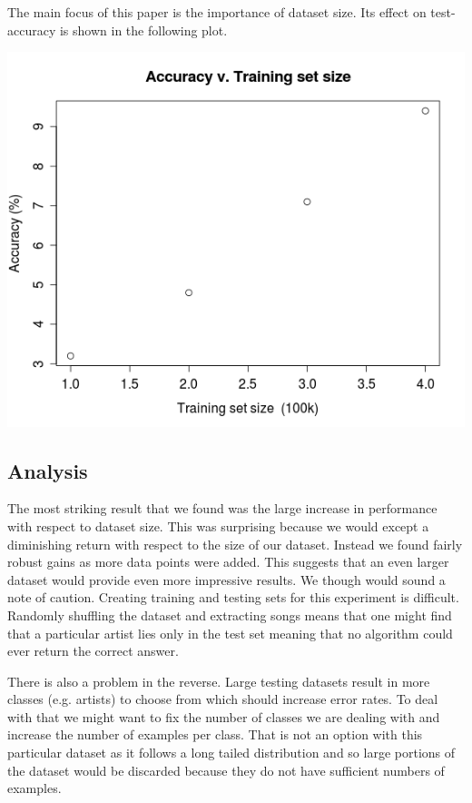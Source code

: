 \documentclass[a4paper,10pt]{article}
\begin{document}
The main focus of this paper is the importance of dataset size. Its effect on test-accuracy is shown in the following plot.
\begin{center}
 \includegraphics[scale=.4,keepaspectratio=true]{./training_set_v_accuracy.png}
\end{center}

\subsection{Analysis}
The most striking result that we found was the large increase in performance with respect to dataset size. This was surprising because we would except a diminishing return with respect to the size of our dataset. Instead we found fairly robust gains as more data points were added. This suggests that an even larger dataset would provide even more impressive results. We though would sound a note of caution. Creating training and testing sets for this experiment is difficult. Randomly shuffling the dataset and extracting songs means that one might find that a particular artist lies only in the test set meaning that no algorithm could ever return the correct answer. 

There is also a problem in the reverse. Large testing datasets result in more classes (e.g. artists) to choose from which should increase error rates. To deal with that we might want to fix the number of classes we are dealing with and increase the number of examples per class. That is not an option with this particular dataset as it follows a long tailed distribution and so large portions of the dataset would be discarded because they do not have sufficient numbers of examples.
\end{document}
